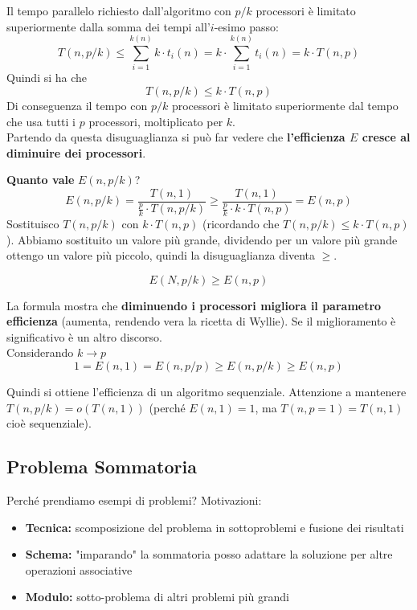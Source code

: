 Il tempo parallelo richiesto dall'algoritmo con $p/k$ processori è limitato superiormente dalla somma dei tempi all'$i$-esimo passo: 
$$ T(n, p/k) \leq \sum_{i = 1}^{k(n)} k \cdot t_i (n) = k \cdot \sum_{i = 1}^{k(n)} t_i (n) = k \cdot T(n, p) $$
Quindi si ha che 
$$ T(n, p/k) \leq k \cdot T(n, p)$$
Di conseguenza il tempo con $p/k$ processori è limitato superiormente dal tempo che usa tutti i $p$ processori, moltiplicato per $k$.\\

Partendo da questa disuguaglianza si può far vedere che \textbf{l'efficienza $E$ cresce al diminuire dei processori}.\\

\newpage

\textbf{Quanto vale} $E \left(n, p/k\right)$?
$$ E \left(n, p/k\right) = \frac{T(n,1)}{\frac{p}{k}  \cdot T(n,p/k)} \geq \frac{T(n,1)}{\frac{p}{k} \cdot k \cdot T(n,p)} = E(n,p) $$
Sostituisco $T(n, p/k)$ con $k \cdot T(n, p)$ (ricordando che $T(n, p/k) \leq k \cdot T(n, p)$). Abbiamo sostituito un valore più grande, dividendo per un valore più grande ottengo un valore più piccolo, quindi la disuguaglianza diventa $\geq$.

$$ E(N, p/k) \geq E(n,p) $$

La formula mostra che \textbf{diminuendo i processori migliora il parametro efficienza} (aumenta, rendendo vera la ricetta di Wyllie). Se il miglioramento è significativo è un altro discorso.\\

Considerando $k \rightarrow p$
$$ 1 = E(n,1) = E(n, p/p) \geq E(n, p/k) \geq E(n,p) $$

Quindi si ottiene l'efficienza di un algoritmo sequenziale. Attenzione a mantenere $T(n, p/k) = o(T(n,1))$ (perché $E(n,1) = 1$, ma $T(n, p=1) = T(n,1)$ cioè sequenziale).\\

\newpage

\subsection{Problema Sommatoria}
Perché prendiamo esempi di problemi? Motivazioni:
\begin{itemize}
	\item \textbf{Tecnica:} scomposizione del problema in sottoproblemi e fusione dei risultati
	\item \textbf{Schema:} "imparando" la sommatoria posso adattare la soluzione per altre operazioni associative
	\item \textbf{Modulo:} sotto-problema di altri problemi più grandi 
\end{itemize}


